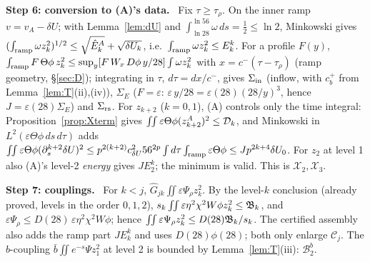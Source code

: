 \documentclass[11pt]{article}
\theoremstyle{definition}\newtheorem{definition}[theorem]{Definition}
\theoremstyle{remark}\newtheorem{remark}[theorem]{Remark}
\begin{document}
\noindent\textbf{Step 6: conversion to (A)'s data.} \tP\ Fix $\tau\ge\tau_\rho$. On the inner ramp $v=v_A-\delta U$; with Lemma~\ref{lem:dU} and $\int_{\ln28}^{\ln56}\omega\,ds=\frac12\le\ln2$, Minkowski gives $(\int_{\rm ramp}\omega z_k^2)^{1/2}\le\sqrt{\hat E^A_k}+\sqrt{\delta U_k}$, i.e.\ $\int_{\rm ramp}\omega z_k^2\le E^k_k$. For a profile $F(y)$, $\int_{\rm ramp}F\,\Theta\phi\,z_k^2\le\sup_y[F\,W_x\,D\phi\,y/28]\int\omega z_k^2$ with $x=c^-(\tau-\tau_\rho)$ (ramp geometry, \S\ref{sec:D}); integrating in $\tau$, $d\tau=dx/c^-$, gives $\Sigma_{\rm in}$ (inflow, with $c^+_b$ from Lemma~\ref{lem:T}(ii),(iv)), $\Sigma_E$ ($F=\varepsilon$: $\varepsilon\,y/28=\varepsilon(28)(28/y)^3$, hence $J=\varepsilon(28)\Sigma_E$) and $\Sigma_{\rm rs}$. For $z_{k+2}$ ($k=0,1$), (A) controls only the time integral: Proposition~\ref{prop:Xterm} gives $\iint\varepsilon\Theta\phi(z^A_{k+2})^2\le\mathcal D_k$, and Minkowski in $L^2(\varepsilon\Theta\phi\,ds\,d\tau)$ adds $\iint\varepsilon\Theta\phi(\partial_s^{k+2}\delta U)^2\le p^{2(k+2)}c_{\delta U}^256^{2p}\int d\tau\int_{\rm ramp}\varepsilon\Theta\phi\le Jp^{2k+4}\delta U_0$. For $z_2$ at level 1 also (A)'s level-2 \emph{energy} gives $JE^k_2$; the minimum is valid. This is $\mathcal X_2,\mathcal X_3$.

\noindent\textbf{Step 7: couplings.} \tP\ For $k<j$, $\hat G_{jk}\iint\varepsilon\Psi_\rho z_k^2$. By the level-$k$ conclusion (already proved, levels in the order $0,1,2$), $s_k\iint\varepsilon\eta^2\chi^2W\phi z_k^2\le\mathfrak B_k$, and $\varepsilon\Psi_\rho\le D(28)\,\varepsilon\eta^2\chi^2W\phi$; hence $\iint\varepsilon\Psi_\rho z_k^2\le D(28)\mathfrak B_k/s_k$. The certified assembly also adds the ramp part $JE^k_k$ and uses $D(28)\phi(28)$; both only enlarge $\mathcal C_j$. The $b$-coupling $\bar b\iint e^{-s}\Psi z_1^2$ at level 2 is bounded by Lemma~\ref{lem:T}(iii): $\mathcal B^b_2$.
\end{document}

